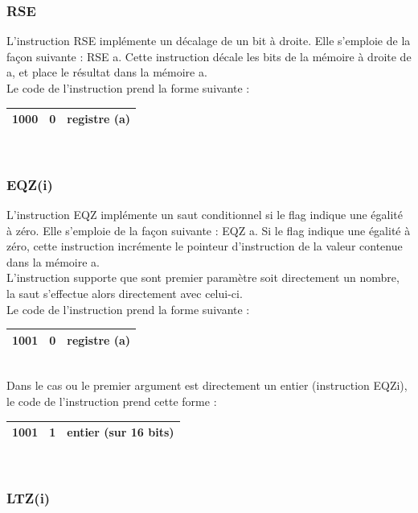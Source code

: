 \documentclass[a4paper, 12pt, twoside]{report}
\begin{document}
\subsubsection{RSE}

L'instruction RSE implémente un décalage de un bit à droite. Elle s'emploie de la façon suivante :
RSE a. Cette instruction décale les bits de la mémoire à droite de a, et place le résultat dans la mémoire a.\\

Le code de l'instruction prend la forme suivante :

\begin{tabular}{|c|c|c|}
  \hline
  1000 & 0 & registre (a) \\
  \hline
\end{tabular}\\

\subsubsection{EQZ(i)}

L'instruction EQZ implémente un saut conditionnel si le flag indique une égalité à zéro. 
Elle s'emploie de la façon suivante : EQZ a. Si le flag indique une égalité à zéro, 
cette instruction incrémente le pointeur d'instruction de la valeur contenue dans 
la mémoire a.\\
L'instruction supporte que sont premier paramètre soit directement un nombre, la saut
s'effectue alors directement avec celui-ci.\\

Le code de l'instruction prend la forme suivante :

\begin{tabular}{|c|c|c|}
  \hline
  1001 & 0 & registre (a) \\
  \hline
\end{tabular}\\

Dans le cas ou le premier argument est directement un entier (instruction EQZi),
le code de l'instruction prend cette forme :

\begin{tabular}{|c|c|c|}
  \hline
  1001 & 1 & entier (sur 16 bits)\\
  \hline
\end{tabular}\\

\subsubsection{LTZ(i)}
\end{document}
